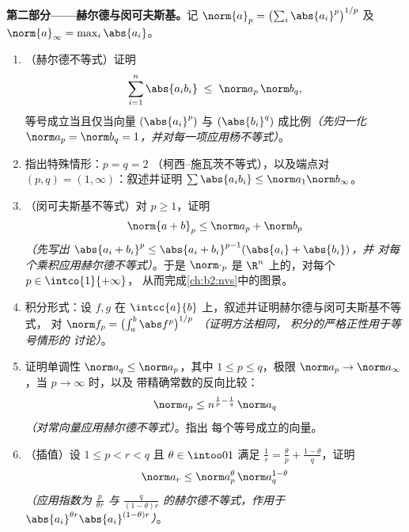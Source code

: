 \begin{problem}
\medskip
\noindent\textbf{第二部分——赫尔德与闵可夫斯基。}记
$\norm{a}_p = \bigl(\sum_i \abs{a_i}^p\bigr)^{1/p}$ 及
$\norm{a}_\infty = \max_i\abs{a_i}$。
\begin{enumerate}[resume]
  \item （赫尔德不等式）证明
        \[
        \sum_{i=1}^{n}\abs{a_ib_i} \;\leq\;
        \norm a_p\,\norm b_q ,
        \]
        等号成立当且仅当向量 $(\abs{a_i}^p)$ 与
        $(\abs{b_i}^q)$ 成比例\emph{（先归一化
        $\norm a_p = \norm b_q = 1$，并对每一项应用杨不等式）}。
  \item 指出特殊情形：$p = q = 2$
        （柯西–施瓦茨不等式），以及端点对 $(p, q) = (1,
        \infty)$：叙述并证明 $\sum\abs{a_ib_i} \leq
        \norm a_1\norm b_\infty$。
  \item （闵可夫斯基不等式）对 $p \geq 1$，证明
        \[
        \norm{a + b}_p \leq \norm a_p + \norm b_p
        \]
        \emph{（先写出 $\abs{a_i + b_i}^p \leq \abs{a_i +
        b_i}^{p-1}(\abs{a_i} + \abs{b_i})$，并
        对每个乘积应用赫尔德不等式）}。于是 $\norm\cdot_p$ 是
        $\R^n$ 上的，对每个 $p \in \intco{1}{+\infty}$，
        从而完成\cref{ch:b2:nvs}中的图景。
  \item 积分形式：设 $f, g$ 在
        $\intcc{a}{b}$ 上，叙述并证明赫尔德与闵可夫斯基不等式，
        对 $\norm f_p = \bigl(\int_a^b\abs
        f^p\bigr)^{1/p}$ \emph{（证明方法相同，
        积分的严格正性用于等号情形的
        讨论）}。
  \item 证明单调性 $\norm a_q \leq \norm a_p$，其中 $1
        \leq p \leq q$，极限 $\norm a_p \to
        \norm a_\infty$，当 $p \to \infty$ 时，以及
        带精确常数的反向比较：
        \[
        \norm a_p \leq n^{\frac1p - \frac1q}\,\norm a_q
        \]
        \emph{（对常向量应用赫尔德不等式）}。指出
        每个等号成立的向量。
  \item （插值）设 $1 \leq p < r < q$ 且 $\theta \in
        \intoo01$ 满足 $\frac1r = \frac\theta p +
        \frac{1-\theta}q$，证明
        \[
        \norm a_r \leq \norm a_p^{\theta}\,
        \norm a_q^{1-\theta}
        \]
        \emph{（应用指数为 $\frac{p}{\theta
        r}$ 与 $\frac{q}{(1-\theta)r}$ 的赫尔德不等式，作用于 $\abs{a_i}^{\theta
        r}\abs{a_i}^{(1-\theta)r}$）}。
\end{enumerate}


\end{problem}
